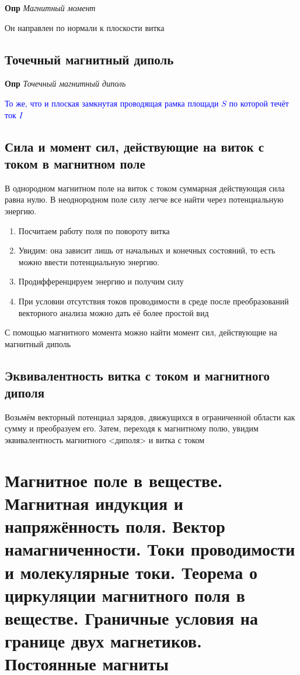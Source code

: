 \documentclass[a4paper, 14pt]{article}
\begin{document}
    \textbf{Опр} \textit{Магнитный момент}
    
    Он направлен по нормали к плоскости витка
    
    \subsection{Точечный магнитный диполь}
    
    \textbf{Опр} \textit{Точечный магнитный диполь}
    
    \textcolor{blue}{То же, что и плоская замкнутая проводящая рамка площади $S$ по которой течёт ток $I$}
    
    \subsection{Сила и момент сил, действующие на виток с током в магнитном поле}
    
    В однородном магнитном поле на виток с током суммарная действующая сила равна нулю.
    В неоднородном поле силу легче все найти через потенциальную энергию.
    
    \begin{enumerate}
        \item Посчитаем работу поля по повороту витка
        \item Увидим: она зависит лишь от начальных и конечных состояний, то есть можно ввести потенциальную энергию.
        \item Продифференцируем энергию и получим силу
        \item При условии отсутствия токов проводимости в среде после преобразований векторного анализа можно дать её
        более простой вид
    \end{enumerate}
    
    С помощью магнитного момента можно найти момент сил, действующие на магнитный диполь
    
    \subsection{Эквивалентность витка с током и магнитного диполя}
    
    Возьмём векторный потенциал зарядов, движущихся в ограниченной области как сумму и преобразуем его.
    Затем, переходя к магнитному полю, увидим эквивалентность магнитного <диполя> и витка с током
    
    \section{Магнитное поле в веществе.
    Магнитная индукция и напряжённость поля.
    Вектор намагниченности.
    Токи проводимости и молекулярные токи.
    Теорема о циркуляции магнитного поля в веществе.
    Граничные условия на границе двух магнетиков.
    Постоянные магниты}
    
\end{document}
